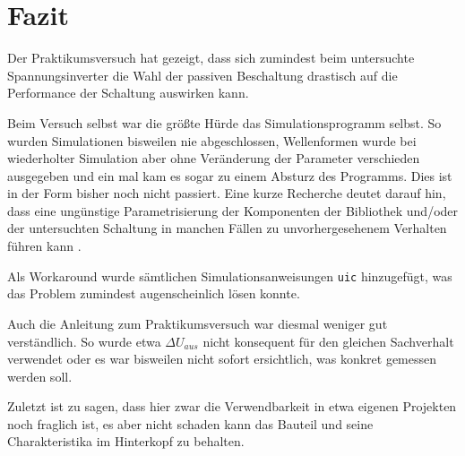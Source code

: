 \chapter{Fazit}
	Der Praktikumsversuch hat gezeigt, dass sich zumindest beim untersuchte Spannungsinverter die Wahl der passiven Beschaltung
	drastisch auf die Performance der Schaltung auswirken kann.\par\medskip
	Beim Versuch selbst war die größte Hürde das Simulationsprogramm selbst. So wurden Simulationen bisweilen nie abgeschlossen,
	Wellenformen wurde bei wiederholter Simulation aber ohne Veränderung der Parameter verschieden ausgegeben und ein mal
	kam es sogar zu einem Absturz des Programms. Dies ist in der Form bisher noch nicht passiert. Eine kurze Recherche deutet darauf hin,
	dass eine ungünstige Parametrisierung der Komponenten der Bibliothek und/oder der untersuchten Schaltung in manchen Fällen
	zu unvorhergesehenem Verhalten führen kann \cite{ltspice.bug}.\par
	Als Workaround wurde sämtlichen Simulationsanweisungen \texttt{uic} hinzugefügt, was das Problem zumindest augenscheinlich lösen konnte.\par\medskip
	Auch die Anleitung zum Praktikumsversuch war diesmal weniger gut verständlich. So wurde etwa \(\Delta U_{aus}\) nicht konsequent
	für den gleichen Sachverhalt verwendet oder es war bisweilen nicht sofort ersichtlich, was konkret gemessen werden soll.\par\medskip
	Zuletzt ist zu sagen, dass hier zwar die Verwendbarkeit in etwa eigenen Projekten noch fraglich ist, es aber nicht schaden kann das Bauteil
	und seine Charakteristika im Hinterkopf zu behalten.